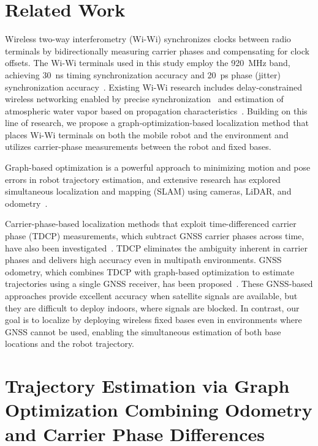 \documentclass[conference]{IEEEtran}
\begin{document}
\section{Related Work}
Wireless two-way interferometry (Wi-Wi) synchronizes clocks between radio terminals by bidirectionally measuring carrier phases and compensating for clock offsets.
The Wi-Wi terminals used in this study employ the 920~MHz band, achieving 30~ns timing synchronization accuracy and 20~ps phase (jitter) synchronization accuracy~\cite{ouchi2024evaluation}.
Existing Wi-Wi research includes delay-constrained wireless networking enabled by precise synchronization~\cite{Yamasaki2021} and estimation of atmospheric water vapor based on propagation characteristics~\cite{Yasuda2019}.
Building on this line of research, we propose a graph-optimization-based localization method that places Wi-Wi terminals on both the mobile robot and the environment and utilizes carrier-phase measurements between the robot and fixed bases.

Graph-based optimization is a powerful approach to minimizing motion and pose errors in robot trajectory estimation, and extensive research has explored simultaneous localization and mapping (SLAM) using cameras, LiDAR, and odometry~\cite{grisetti2010tutorial,graph_slam_urban_mapping,graph_slam_2012}.

Carrier-phase-based localization methods that exploit time-differenced carrier phase (TDCP) measurements, which subtract GNSS carrier phases across time, have also been investigated~\cite{TDCP2008,TDCP2022}.
TDCP eliminates the ambiguity inherent in carrier phases and delivers high accuracy even in multipath environments.
GNSS odometry, which combines TDCP with graph-based optimization to estimate trajectories using a single GNSS receiver, has been proposed~\cite{suzuki2022gnss}.
These GNSS-based approaches provide excellent accuracy when satellite signals are available, but they are difficult to deploy indoors, where signals are blocked.
In contrast, our goal is to localize by deploying wireless fixed bases even in environments where GNSS cannot be used, enabling the simultaneous estimation of both base locations and the robot trajectory.

\section{Trajectory Estimation via Graph Optimization Combining Odometry and Carrier Phase Differences}
\end{document}
